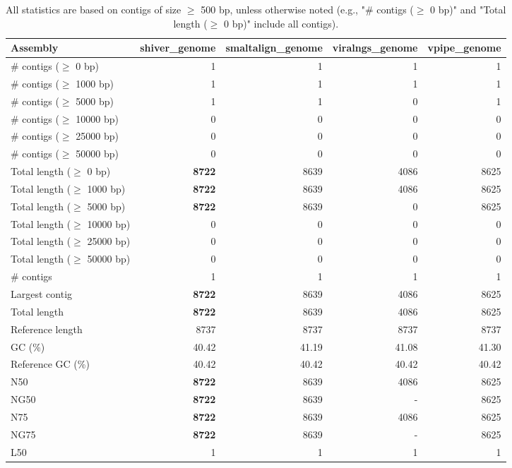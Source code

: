 \documentclass[12pt,a4paper]{article}
\begin{document}
\begin{table}[ht]
\begin{center}
\caption{All statistics are based on contigs of size $\geq$ 500 bp, unless otherwise noted (e.g., "\# contigs ($\geq$ 0 bp)" and "Total length ($\geq$ 0 bp)" include all contigs).}
\begin{tabular}{|l*{4}{|r}|}
\hline
Assembly & shiver\_genome & smaltalign\_genome & viralngs\_genome & vpipe\_genome \\ \hline
\# contigs ($\geq$ 0 bp) & 1 & 1 & 1 & 1 \\ \hline
\# contigs ($\geq$ 1000 bp) & 1 & 1 & 1 & 1 \\ \hline
\# contigs ($\geq$ 5000 bp) & 1 & 1 & 0 & 1 \\ \hline
\# contigs ($\geq$ 10000 bp) & 0 & 0 & 0 & 0 \\ \hline
\# contigs ($\geq$ 25000 bp) & 0 & 0 & 0 & 0 \\ \hline
\# contigs ($\geq$ 50000 bp) & 0 & 0 & 0 & 0 \\ \hline
Total length ($\geq$ 0 bp) & {\bf 8722} & 8639 & 4086 & 8625 \\ \hline
Total length ($\geq$ 1000 bp) & {\bf 8722} & 8639 & 4086 & 8625 \\ \hline
Total length ($\geq$ 5000 bp) & {\bf 8722} & 8639 & 0 & 8625 \\ \hline
Total length ($\geq$ 10000 bp) & 0 & 0 & 0 & 0 \\ \hline
Total length ($\geq$ 25000 bp) & 0 & 0 & 0 & 0 \\ \hline
Total length ($\geq$ 50000 bp) & 0 & 0 & 0 & 0 \\ \hline
\# contigs & 1 & 1 & 1 & 1 \\ \hline
Largest contig & {\bf 8722} & 8639 & 4086 & 8625 \\ \hline
Total length & {\bf 8722} & 8639 & 4086 & 8625 \\ \hline
Reference length & 8737 & 8737 & 8737 & 8737 \\ \hline
GC (\%) & 40.42 & 41.19 & 41.08 & 41.30 \\ \hline
Reference GC (\%) & 40.42 & 40.42 & 40.42 & 40.42 \\ \hline
N50 & {\bf 8722} & 8639 & 4086 & 8625 \\ \hline
NG50 & {\bf 8722} & 8639 & - & 8625 \\ \hline
N75 & {\bf 8722} & 8639 & 4086 & 8625 \\ \hline
NG75 & {\bf 8722} & 8639 & - & 8625 \\ \hline
L50 & 1 & 1 & 1 & 1 \\ \hline

\end{tabular}
\end{center}
\end{table}
\end{document}
